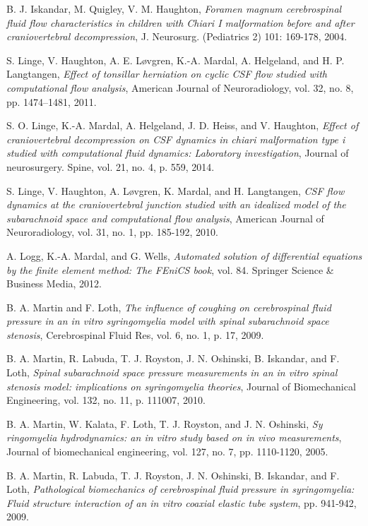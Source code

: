 \documentclass[a4paper,11pt,openright,twoside]{book}
\begin{document}
\begin{thebibliography}{100}
 B. J. Iskandar, M. Quigley, V. M. Haughton, \emph{Foramen magnum cerebrospinal fluid flow characteristics in children with Chiari I malformation before and after craniovertebral decompression}, J. Neurosurg. (Pediatrics 2) 101: 169-178, 2004.


  S. Linge, V. Haughton, A. E. Løvgren, K.-A. Mardal, A. Helgeland, and H. P. Langtangen, \emph{Effect of tonsillar herniation on cyclic CSF flow studied with computational flow analysis}, American Journal of Neuroradiology, vol. 32, no. 8, pp. 1474–1481, 2011.

 S. O. Linge, K.-A. Mardal, A. Helgeland, J. D. Heiss, and V. Haughton, \emph{Effect of craniovertebral decompression on CSF dynamics in chiari malformation type i studied with computational fluid dynamics: Laboratory investigation}, Journal of neurosurgery. Spine, vol. 21, no. 4, p. 559, 2014.

 S. Linge, V. Haughton, A. Løvgren, K. Mardal, and H. Langtangen, \emph{CSF flow dynamics at the craniovertebral junction studied with an idealized model of the subarachnoid space and computational flow analysis}, American Journal of Neuroradiology, vol. 31, no. 1, pp. 185-192, 2010.


 A. Logg, K.-A. Mardal, and G. Wells, \emph{Automated solution of differential equations by the finite element method: The FEniCS book}, vol. 84. Springer Science \& Business Media, 2012.


 B. A. Martin and F. Loth, \emph{The influence of coughing on cerebrospinal fluid pressure in an in vitro syringomyelia model with spinal subarachnoid space stenosis}, Cerebrospinal Fluid Res, vol. 6, no. 1, p. 17, 2009.

 B. A. Martin, R. Labuda, T. J. Royston, J. N. Oshinski, B. Iskandar, and F. Loth, \emph{Spinal subarachnoid space pressure measurements in an in vitro spinal stenosis model: implications on syringomyelia theories}, Journal of Biomechanical Engineering, vol. 132, no. 11, p. 111007, 2010.

 B. A. Martin, W. Kalata, F. Loth, T. J. Royston, and J. N. Oshinski, \emph{Sy ringomyelia hydrodynamics: an in vitro study based on in vivo measurements}, Journal of biomechanical engineering, vol. 127, no. 7, pp. 1110-1120, 2005.

 B. A. Martin, R. Labuda, T. J. Royston, J. N. Oshinski, B. Iskandar, and F. Loth, \emph{Pathological biomechanics of cerebrospinal fluid pressure in syringomyelia: Fluid structure interaction of an in vitro coaxial elastic tube system}, pp. 941-942, 2009.


\end{thebibliography}
\end{document}
